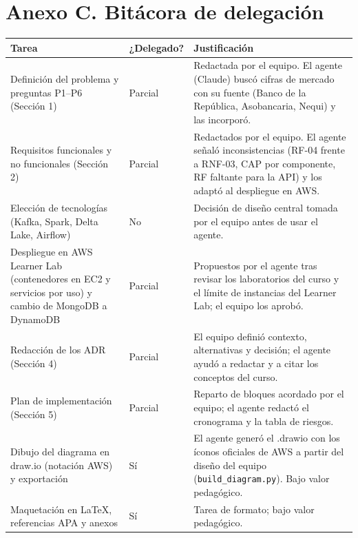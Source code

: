 \documentclass[12pt,letterpaper]{article}
\begin{document}
\section*{Anexo C. Bitácora de delegación}
\begin{footnotesize}
\begin{tabular}{@{}P{2.2in}P{0.85in}P{3.25in}@{}}
\toprule
\textbf{Tarea} & \textbf{¿Delegado?} & \textbf{Justificación}\\
\midrule
Definición del problema y preguntas P1--P6 (Sección 1) & Parcial & Redactada por el equipo. El agente (Claude) buscó cifras de mercado con su fuente (Banco de la República, Asobancaria, Nequi) y las incorporó.\\[1pt]
Requisitos funcionales y no funcionales (Sección 2) & Parcial & Redactados por el equipo. El agente señaló inconsistencias (RF-04 frente a RNF-03, CAP por componente, RF faltante para la API) y los adaptó al despliegue en AWS.\\[1pt]
Elección de tecnologías (Kafka, Spark, Delta Lake, Airflow) & No & Decisión de diseño central tomada por el equipo antes de usar el agente.\\[1pt]
Despliegue en AWS Learner Lab (contenedores en EC2 y servicios por uso) y cambio de MongoDB a DynamoDB & Parcial & Propuestos por el agente tras revisar los laboratorios del curso y el límite de instancias del Learner Lab; el equipo los aprobó.\\[1pt]
Redacción de los ADR (Sección 4) & Parcial & El equipo definió contexto, alternativas y decisión; el agente ayudó a redactar y a citar los conceptos del curso.\\[1pt]
Plan de implementación (Sección 5) & Parcial & Reparto de bloques acordado por el equipo; el agente redactó el cronograma y la tabla de riesgos.\\[1pt]
Dibujo del diagrama en draw.io (notación AWS) y exportación & Sí & El agente generó el .drawio con los íconos oficiales de AWS a partir del diseño del equipo (\texttt{build\_diagram.py}). Bajo valor pedagógico.\\[1pt]
Maquetación en LaTeX, referencias APA y anexos & Sí & Tarea de formato; bajo valor pedagógico.\\[1pt]
\bottomrule
\end{tabular}
\end{footnotesize}
\end{document}
